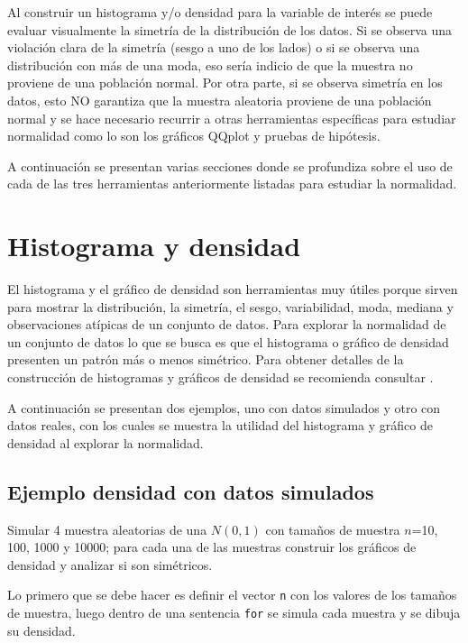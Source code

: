 \documentclass[10pt,]{krantz}
\begin{document}
Al construir un histograma y/o densidad para la variable de interés se
puede evaluar visualmente la simetría de la distribución de los datos.
Si se observa una violación clara de la simetría (sesgo a uno de los
lados) o si se observa una distribución con más de una moda, eso sería
indicio de que la muestra no proviene de una población normal. Por otra
parte, si se observa simetría en los datos, esto NO garantiza que la
muestra aleatoria proviene de una población normal y se hace necesario
recurrir a otras herramientas específicas para estudiar normalidad como
lo son los gráficos QQplot y pruebas de hipótesis.

A continuación se presentan varias secciones donde se profundiza sobre
el uso de cada de las tres herramientas anteriormente listadas para
estudiar la normalidad.

\section{Histograma y densidad}\label{histograma-y-densidad}

El histograma y el gráfico de densidad son herramientas muy útiles
porque sirven para mostrar la distribución, la simetría, el sesgo,
variabilidad, moda, mediana y observaciones atípicas de un conjunto de
datos. Para explorar la normalidad de un conjunto de datos lo que se
busca es que el histograma o gráfico de densidad presenten un patrón más
o menos simétrico. Para obtener detalles de la construcción de
histogramas y gráficos de densidad se recomienda consultar
\citet{hernandez_correa}.

A continuación se presentan dos ejemplos, uno con datos simulados y otro
con datos reales, con los cuales se muestra la utilidad del histograma y
gráfico de densidad al explorar la normalidad.

\subsection*{Ejemplo densidad con datos
simulados}\label{ejemplo-densidad-con-datos-simulados}


Simular 4 muestra aleatorias de una \(N(0, 1)\) con tamaños de muestra
\(n\)=10, 100, 1000 y 10000; para cada una de las muestras construir los
gráficos de densidad y analizar si son simétricos.

Lo primero que se debe hacer es definir el vector \texttt{n} con los
valores de los tamaños de muestra, luego dentro de una sentencia
\texttt{for} se simula cada muestra y se dibuja su densidad.
\end{document}
